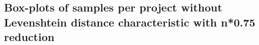 \begin{appendices}
\section{Box-plots of samples per project without Levenshtein distance characteristic with n*0.75 reduction}
\label{ap:no_distance_75}
\begin{figure}[h]
    \centering
    \qquad
\end{figure}


\end{appendices}
